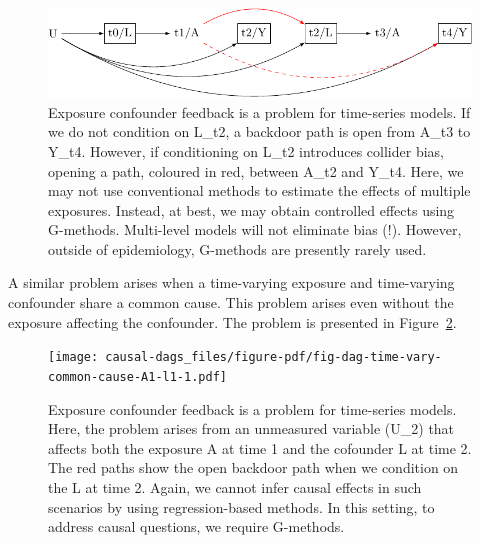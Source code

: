 \documentclass[
  singlecolumn,
  9pt]{article}
\begin{document}
\begin{figure}

{\centering \includegraphics[width=1\textwidth,height=\textheight]{causal-dags_files/figure-pdf/fig-dag-9-1.pdf}

}

\caption{\label{fig-dag-9}Exposure confounder feedback is a problem for
time-series models. If we do not condition on L\_t2, a backdoor path is
open from A\_t3 to Y\_t4. However, if conditioning on L\_t2 introduces
collider bias, opening a path, coloured in red, between A\_t2 and Y\_t4.
Here, we may not use conventional methods to estimate the effects of
multiple exposures. Instead, at best, we may obtain controlled effects
using G-methods. Multi-level models will not eliminate bias (!).
However, outside of epidemiology, G-methods are presently rarely used.}

\end{figure}

A similar problem arises when a time-varying exposure and time-varying
confounder share a common cause. This problem arises even without the
exposure affecting the confounder. The problem is presented in
Figure~\ref{fig-dag-time-vary-common-cause-A1-l1}.

\begin{figure}

{\centering \texttt{[image: causal-dags\_files/figure-pdf/fig-dag-time-vary-common-cause-A1-l1-1.pdf]}

}

\caption{\label{fig-dag-time-vary-common-cause-A1-l1}Exposure confounder
feedback is a problem for time-series models. Here, the problem arises
from an unmeasured variable (U\_2) that affects both the exposure A at
time 1 and the cofounder L at time 2. The red paths show the open
backdoor path when we condition on the L at time 2. Again, we cannot
infer causal effects in such scenarios by using regression-based
methods. In this setting, to address causal questions, we require
G-methods.}

\end{figure}
\end{document}
